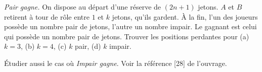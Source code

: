 \emph{Pair gagne.} On dispose au départ d'une réserve de $(2n + 1)$ jetons. $A$ et $B$ retirent à tour de rôle entre $1$ et $k$ jetons, qu'ils gardent. À la fin, l'un des joueurs possède un nombre pair de jetons, l'autre un nombre impair. Le gagnant est celui qui possède un nombre pair de jetons. Trouver les positions perdantes pour (a) $k = 3$, (b) $k = 4$, (c) $k$ pair, (d) $k$ impair.

Étudier aussi le cas où \emph{Impair gagne}. Voir la référence [28] de l'ouvrage.
